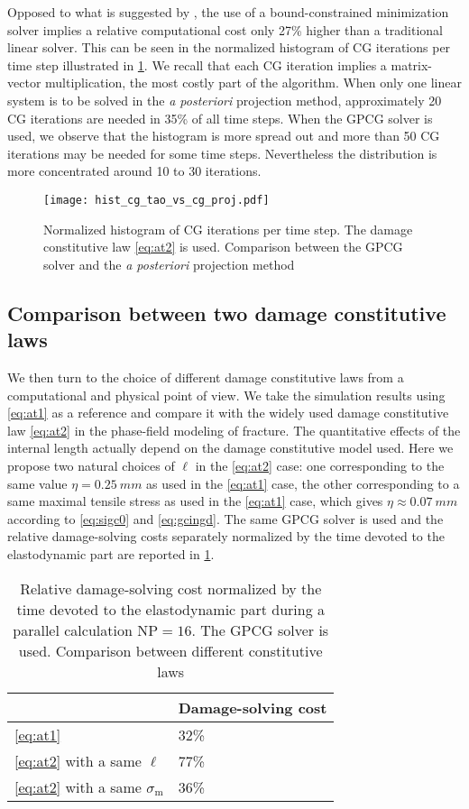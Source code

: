 Opposed to what is suggested by \cite{AmorMarigoMaurini:2009}, the use of a bound-constrained minimization solver implies a relative computational cost only 27\% higher than a traditional linear solver. This can be seen in the normalized histogram of CG iterations per time step illustrated in \cref{fig:histcg}. We recall that each CG iteration implies a matrix-vector multiplication, the most costly part of the algorithm. When only one linear system is to be solved in the \emph{a posteriori} projection method, approximately 20 CG iterations are needed in 35\% of all time steps. When the GPCG solver is used, we observe that the histogram is more spread out and more than 50 CG iterations may be needed for some time steps. Nevertheless the distribution is more concentrated around 10 to 30 iterations.
\begin{figure}[htbp]
\centering
\texttt{[image: hist\_cg\_tao\_vs\_cg\_proj.pdf]}
\caption{Normalized histogram of CG iterations per time step. The damage constitutive law \eqref{eq:at2} is used. Comparison between the GPCG solver and the \emph{a posteriori} projection method} \label{fig:histcg}
\end{figure}

\subsection{Comparison between two damage constitutive laws}
We then turn to the choice of different damage constitutive laws from a computational and physical point of view. We take the simulation results using \eqref{eq:at1} as a reference and compare it with the widely used damage constitutive law \eqref{eq:at2} in the phase-field modeling of fracture. The quantitative effects of the internal length actually depend on the damage constitutive model used. Here we propose two natural choices of $\ell$ in the \eqref{eq:at2} case: one corresponding to the same value $\eta=\SI{0.25}{mm}$ as used in the \eqref{eq:at1} case, the other corresponding to a same maximal tensile stress as used in the \eqref{eq:at1} case, which gives $\eta\approx\SI{0.07}{mm}$ according to \eqref{eq:sigc0} and \eqref{eq:gcingd}. The same GPCG solver is used and the relative damage-solving costs separately normalized by the time devoted to the elastodynamic part are reported in \cref{tab:at1_vs_at2}.
\begin{table}[htbp]
\centering
\caption{Relative damage-solving cost normalized by the time devoted to the elastodynamic part during a parallel calculation $\mathrm{NP}=16$. The GPCG solver is used. Comparison between different constitutive laws} \label{tab:at1_vs_at2}
\begin{tabular}{ll} \toprule
& Damage-solving cost  \\ \midrule
\eqref{eq:at1} & 32\% \\
\eqref{eq:at2} with a same $\ell$ & 77\% \\
\eqref{eq:at2} with a same $\sigma_\mathrm{m}$ & 36\% \\ \bottomrule
\end{tabular}
\end{table}

